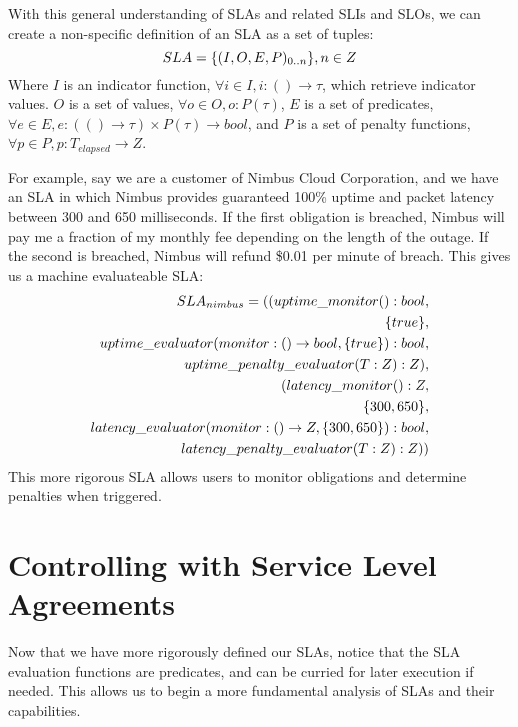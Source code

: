 With this general understanding of SLAs and related SLIs and SLOs, we can create a non-specific definition of an SLA as a set of tuples:
\begin{equation}
SLA = \lbrace (I,O,E,P)_{0..n} \rbrace, n \in Z \\
\end{equation}
Where $ I $ is an indicator function, $ \forall i \in I, i : () \rightarrow \tau $, which retrieve indicator values.  $ O $ is a set of values, $ \forall o \in O, o : P(\tau) $, $ E $ is a set of predicates, $ \forall e \in E, e : ( () \rightarrow \tau ) \times P(\tau) \rightarrow bool $, and $ P $ is a set of penalty functions, $ \forall p \in P, p : T_{elapsed} \rightarrow Z $.

For example, say we are a customer of Nimbus Cloud Corporation, and we have an SLA in which Nimbus provides guaranteed 100\% uptime and packet latency between 300 and 650 milliseconds.  If the first obligation is breached, Nimbus will pay me a fraction of my monthly fee depending on the length of the outage.  If the second is breached, Nimbus will refund \$0.01 per minute of breach.  This gives us a machine evaluateable SLA:
\begin{align}
SLA_{nimbus} = ( ( uptime\_monitor() : bool, \\
\lbrace true \rbrace, \notag \\
uptime\_evaluator( monitor : () \rightarrow bool, \lbrace true \rbrace) : bool, \notag \\
uptime\_penalty\_evaluator( T : Z ) : Z ), \notag \\
( latency\_monitor() : Z, \notag \\
\lbrace 300, 650 \rbrace, \notag \\
latency\_evaluator( monitor : () \rightarrow Z, \lbrace 300, 650 \rbrace) : bool, \notag \\
latency\_penalty\_evaluator( T : Z ) : Z) ) \notag
\end{align}
This more rigorous SLA allows users to monitor obligations and determine penalties when triggered.

\section{Controlling with Service Level Agreements}\label{sec:SLA-analysis}
Now that we have more rigorously defined our SLAs, notice that the SLA evaluation functions are predicates, and can be curried for later execution if needed.  This allows us to begin a more fundamental analysis of SLAs and their capabilities.

